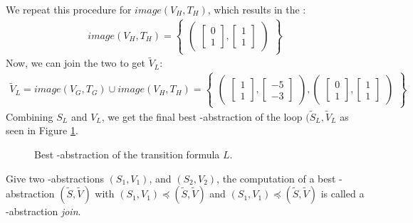We repeat this procedure for $image(V_H, T_H)$, which results in the \qvasr:
\begin{align*}
	image(V_H, T_H) = 
	\begin{Bmatrix}
		\begin{pmatrix}
			\begin{bmatrix}
				0 \\
				1 
			\end{bmatrix},
			\begin{bmatrix}
				1 \\
				1 
			\end{bmatrix}
		\end{pmatrix}
	\end{Bmatrix}
\end{align*}  	
Now, we can join the two \qvasr to get $\tilde{V}_L$:
\begin{align*}
		\tilde{V}_L = image(V_G, T_G) \cup image(V_H, T_H) = 
	\begin{Bmatrix}
		\begin{pmatrix}
			\begin{bmatrix}
				1 \\
				1 
			\end{bmatrix},
			\begin{bmatrix}
				-5 \\
				-3 
			\end{bmatrix}
		\end{pmatrix}, 
		\begin{pmatrix}
			\begin{bmatrix}
				0 \\
				1 
			\end{bmatrix},
			\begin{bmatrix}
				1 \\
				1 
			\end{bmatrix}
		\end{pmatrix}
	\end{Bmatrix}
\end{align*}
Combining $S_L$ and $V_L$, we get the final best \qvasr-abstraction of the loop $(\tilde{S}_L, \tilde{V}_L$ as seen in Figure \ref{vasr}.
\begin{center}
	\begin{figure}[H]
		
		\caption{Best \qvasr-abstraction of the transition formula $L$.}
		\label{vasr}
	\end{figure}
\end{center}
Give two \qvasr-abstractions $(S_1, V_1)$, and $(S_2, V_2)$, the computation of a best \qvasr-abstraction $(\tilde{S}, \tilde{V})$ with $(S_1, V_1) \preceq (\tilde{S}, \tilde{V})$ and  $(S_1, V_1) \preceq (\tilde{S}, \tilde{V})$ is called a \qvasr-abstraction \textsl{join}.

